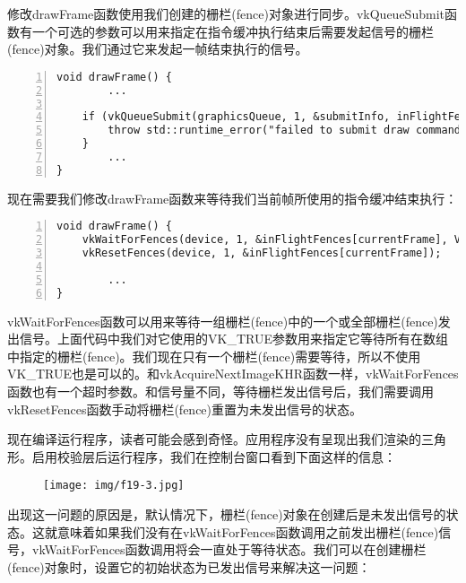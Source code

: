 \documentclass{ctexart}
\begin{document}
修改drawFrame函数使用我们创建的栅栏(fence)对象进行同步。vkQueueSubmit函数有一个可选的参数可以用来指定在指令缓冲执行结束后需要发起信号的栅栏(fence)对象。我们通过它来发起一帧结束执行的信号。

\begin{lstlisting}[language={[ANSI]C},keywordstyle=\color{blue!70},commentstyle=\color{red!50!green!50!blue!50},frame=shadowbox, rulesepcolor=\color{red!20!green!20!blue!20},basicstyle=\small,numbers=left, numberstyle=\tiny,breaklines=true]
void drawFrame() {
		...

	if (vkQueueSubmit(graphicsQueue, 1, &submitInfo, inFlightFences[currentFrame]) != VK_SUCCESS) {
		throw std::runtime_error("failed to submit draw command buffer!");
	}
		...
}
\end{lstlisting}

现在需要我们修改drawFrame函数来等待我们当前帧所使用的指令缓冲结束执行：

\begin{lstlisting}[language={[ANSI]C},keywordstyle=\color{blue!70},commentstyle=\color{red!50!green!50!blue!50},frame=shadowbox, rulesepcolor=\color{red!20!green!20!blue!20},basicstyle=\small,numbers=left, numberstyle=\tiny,breaklines=true]
void drawFrame() {
	vkWaitForFences(device, 1, &inFlightFences[currentFrame], VK_TRUE, std::numeric_limits<uint64_t>::max());
	vkResetFences(device, 1, &inFlightFences[currentFrame]);

		...
}
\end{lstlisting}

vkWaitForFences函数可以用来等待一组栅栏(fence)中的一个或全部栅栏(fence)发出信号。上面代码中我们对它使用的VK\_TRUE参数用来指定它等待所有在数组中指定的栅栏(fence)。我们现在只有一个栅栏(fence)需要等待，所以不使用VK\_TRUE也是可以的。和vkAcquireNextImageKHR函数一样，vkWaitForFences函数也有一个超时参数。和信号量不同，等待栅栏发出信号后，我们需要调用vkResetFences函数手动将栅栏(fence)重置为未发出信号的状态。

现在编译运行程序，读者可能会感到奇怪。应用程序没有呈现出我们渲染的三角形。启用校验层后运行程序，我们在控制台窗口看到下面这样的信息：

\begin{figure}[H]
	\centering
	\texttt{[image: img/f19-3.jpg]}
\end{figure}

出现这一问题的原因是，默认情况下，栅栏(fence)对象在创建后是未发出信号的状态。这就意味着如果我们没有在vkWaitForFences函数调用之前发出栅栏(fence)信号，vkWaitForFences函数调用将会一直处于等待状态。我们可以在创建栅栏(fence)对象时，设置它的初始状态为已发出信号来解决这一问题：
\end{document}
